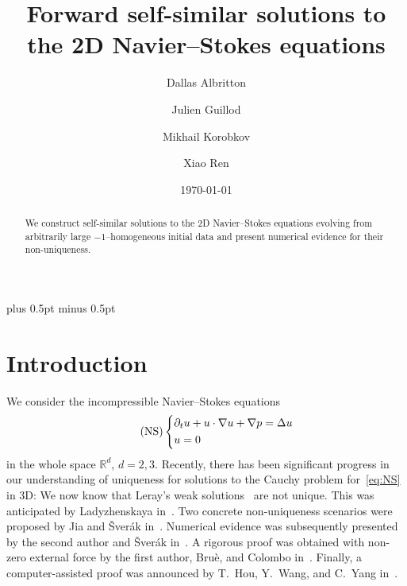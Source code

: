 \documentclass[12pt,reqno]{amsart}
\title{Forward self-similar solutions to the 2D Navier--Stokes equations}
\author[Albritton]{Dallas Albritton}
\author[Guillod]{Julien Guillod}
\author[Korobkov]{Mikhail Korobkov}
\author[Ren]{Xiao Ren}
\date\today
\theoremstyle{plain}
\theoremstyle{definition}
\newcommand{\R}{\mathbb{R}}
\newcommand{\p}{\partial}
\renewcommand{\:}{\colon}
\let\div\relax
\DeclareMathOperator{\div}{div}
\numberwithin{equation}{section}
\numberwithin{figure}{section}
\begin{document}
\begin{abstract}
We construct self-similar solutions to the 2D Navier--Stokes equations evolving from arbitrarily large $-1$--homogeneous initial data and present numerical evidence for their non-uniqueness.
\end{abstract}


\maketitle

\setcounter{tocdepth}{1}
\tableofcontents

\parskip   2pt plus 0.5pt minus 0.5pt

\section{Introduction}

We consider the incompressible Navier--Stokes equations
\begin{equation}
\label{eq:NS}
\tag{NS}
\left\{
    \begin{aligned}
        &\p_t u + u \cdot \nabla u + \nabla p = \Delta u \\
        &\div u = 0
    \end{aligned}\right. 
\end{equation}
in the whole space $\R^d$, $d=2,3$. Recently, there has been significant progress in our understanding of uniqueness for solutions to the Cauchy problem for~\eqref{eq:NS} in 3D: We now know that Leray's weak solutions~\cite{leray1934} are not unique. 
This was anticipated by Ladyzhenskaya in~\cite{ladyzhenskayanonuniqueness}. Two concrete non-uniqueness scenarios were proposed by Jia and \v{S}ver{\'a}k in~\cite{jiasverakillposed}. Numerical evidence was subsequently presented by the second author and \v{S}ver{\'a}k in~\cite{guillodsverak}. A rigorous proof was obtained with non-zero external force by the first author, Bru{\`e}, and Colombo in~\cite{albritton2021non}. Finally, a computer-assisted proof was announced by T.~Hou, Y.~Wang, and C.~Yang in~\cite{hou2025nonuniqueness}.
\end{document}
